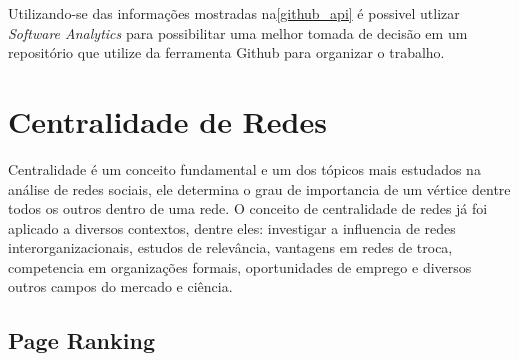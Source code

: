 Utilizando-se das informações mostradas na\ref{github_api} é possivel utlizar
\textit{Software Analytics} para possibilitar uma melhor tomada de decisão em um
repositório que utilize da ferramenta Github para organizar o trabalho.

\section{Centralidade de Redes}

Centralidade é um conceito fundamental e um dos tópicos mais estudados na análise 
de redes sociais, ele determina o grau de importancia de um vértice dentre todos
os outros dentro de uma rede. O conceito de centralidade de redes já foi aplicado a diversos contextos,
dentre eles: investigar a influencia de redes interorganizacionais, estudos de relevância,
vantagens em redes de troca, competencia em organizações formais, oportunidades de emprego 
e diversos outros campos do mercado e ciência\cite{centrality}.

\subsection{Page Ranking}
